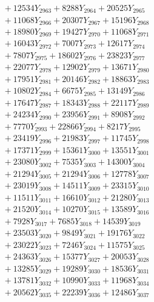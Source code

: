 \documentclass[a4paper,10pt]{article}
\begin{document}
{\begin{align}
&\;  + 12534 Y_{2963} + 8288 Y_{2964} + 20525 Y_{2965} \\[0.3ex]
&\;  + 11068 Y_{2966} + 20307 Y_{2967} + 15196 Y_{2968} \\[0.5ex]\allowbreak
&\;  + 18980 Y_{2969} + 19427 Y_{2970} + 11068 Y_{2971} \\[0.3ex]
&\;  + 16043 Y_{2972} + 7007 Y_{2973} + 12617 Y_{2974} \\[0.3ex]
&\;  + 7807 Y_{2975} + 18602 Y_{2976} + 23823 Y_{2977} \\[0.3ex]
&\;  + 22077 Y_{2978} + 12902 Y_{2979} + 13671 Y_{2980} \\[0.3ex]
&\;  + 17951 Y_{2981} + 20146 Y_{2982} + 18863 Y_{2983} \\[0.3ex]
&\;  + 10802 Y_{2984} + 6675 Y_{2985} + 13149 Y_{2986} \\[0.3ex]
&\;  + 17647 Y_{2987} + 18343 Y_{2988} + 22117 Y_{2989} \\[0.3ex]
&\;  + 24234 Y_{2990} + 23956 Y_{2991} + 8908 Y_{2992} \\[0.3ex]
&\;  + 7770 Y_{2993} + 22866 Y_{2994} + 8217 Y_{2995} \\[0.3ex]
&\;  + 23419 Y_{2996} + 21983 Y_{2997} + 11745 Y_{2998} \\[0.5ex]\allowbreak
&\;  + 17371 Y_{2999} + 15361 Y_{3000} + 13551 Y_{3001} \\[0.3ex]
&\;  + 23080 Y_{3002} + 7535 Y_{3003} + 14300 Y_{3004} \\[0.3ex]
&\;  + 21294 Y_{3005} + 21294 Y_{3006} + 12778 Y_{3007} \\[0.3ex]
&\;  + 23019 Y_{3008} + 14511 Y_{3009} + 23315 Y_{3010} \\[0.3ex]
&\;  + 11511 Y_{3011} + 16610 Y_{3012} + 21280 Y_{3013} \\[0.3ex]
&\;  + 21520 Y_{3014} + 10270 Y_{3015} + 13589 Y_{3016} \\[0.3ex]
&\;  + 7928 Y_{3017} + 7685 Y_{3018} + 14539 Y_{3019} \\[0.3ex]
&\;  + 23503 Y_{3020} + 9849 Y_{3021} + 19176 Y_{3022} \\[0.3ex]
&\;  + 23022 Y_{3023} + 7246 Y_{3024} + 11575 Y_{3025} \\[0.3ex]
&\;  + 24363 Y_{3026} + 15377 Y_{3027} + 20053 Y_{3028} \\[0.5ex]\allowbreak
&\;  + 13285 Y_{3029} + 19289 Y_{3030} + 18536 Y_{3031} \\[0.3ex]
&\;  + 13781 Y_{3032} + 10990 Y_{3033} + 11968 Y_{3034} \\[0.3ex]
&\;  + 20562 Y_{3035} + 22239 Y_{3036} + 12486 Y_{3037} \\[0.3ex]

\end{align}}
\end{document}
